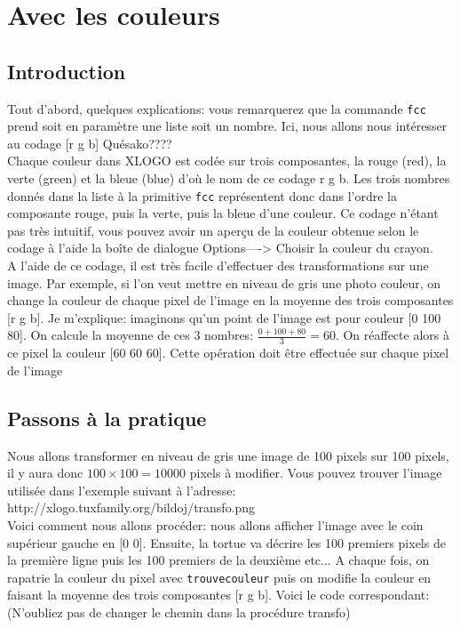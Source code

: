 \section{Avec les couleurs}
\subsection{Introduction}
Tout d'abord, quelques explications: vous remarquerez que la commande \texttt{fcc} prend soit en paramètre une liste soit un nombre. Ici, nous allons nous intéresser au codage [r g b] Quésako????\\
Chaque couleur dans XLOGO est codée sur trois composantes, la rouge (red), la verte (green) et la bleue (blue) d'où le nom de ce codage r g b. Les trois nombres donnés dans la liste à la primitive \texttt{fcc} représentent donc dans l'ordre la composante rouge, puis la verte, puis la bleue d'une couleur. Ce codage n'étant pas très intuitif, vous pouvez avoir un aperçu de la couleur obtenue selon le codage à l'aide la boîte de dialogue Options----> Choisir la couleur du crayon.\\
A l'aide de ce codage, il est très facile d'effectuer des transformations sur une image. Par exemple, si l'on veut mettre en niveau de gris une photo couleur, on change la couleur de chaque pixel de l'image en la moyenne des trois composantes [r g b]. Je m'explique: imaginons qu'un point de l'image est pour couleur [0 100 80]. On calcule la moyenne de  ces 3 nombres: $\frac{0+100+80}{3}=60$. On réaffecte alors à ce pixel la couleur [60 60 60]. Cette opération doit être effectuée sur chaque pixel de l'image
\subsection{Passons à la pratique}
Nous allons transformer en niveau de gris une image de 100 pixels sur 100 pixels, il y aura donc $100\times100=10000$ pixels à modifier. Vous pouvez trouver l'image utilisée dans l'exemple suivant à l'adresse: \\
http://xlogo.tuxfamily.org/bildoj/transfo.png\\
Voici comment nous allons procéder: nous allons afficher l'image avec le coin supérieur gauche en [0 0]. Ensuite, la tortue va décrire les 100 premiers pixels de la première ligne puis les 100 premiers de la deuxième etc... A chaque fois, on rapatrie la couleur du pixel avec \texttt{trouvecouleur} puis on modifie la couleur en faisant la moyenne des trois composantes [r g b]. Voici le code correspondant:\\
(N'oubliez pas de changer le chemin dans la procédure transfo)

